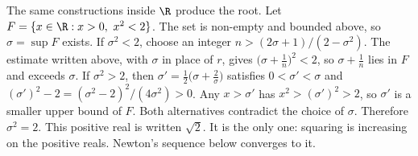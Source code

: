 The same constructions inside $\R$ produce the root. Let $F=\{x\in\R:x>0,\ x^2<2\}$. The set is non-empty and bounded above, so $\sigma=\sup F$ exists. If $\sigma^2<2$, choose an integer $n>(2\sigma+1)/(2-\sigma^2)$. The estimate written above, with $\sigma$ in place of $r$, gives $\bigl(\sigma+\frac1n\bigr)^2<2$, so $\sigma+\frac1n$ lies in $F$ and exceeds $\sigma$. If $\sigma^2>2$, then $\sigma'=\frac12\bigl(\sigma+\frac2\sigma\bigr)$ satisfies $0<\sigma'<\sigma$ and $(\sigma')^2-2=(\sigma^2-2)^2/(4\sigma^2)>0$. Any $x>\sigma'$ has $x^2>(\sigma')^2>2$, so $\sigma'$ is a smaller upper bound of $F$. Both alternatives contradict the choice of $\sigma$. Therefore $\sigma^2=2$. This positive real is written $\sqrt2$. It is the only one: squaring is increasing on the positive reals. Newton's sequence below converges to it.

